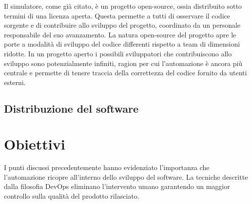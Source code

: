 Il simulatore, come già citato, è un progetto open-source, ossia distribuito sotto termini di una licenza aperta. Questa permette a tutti di osservare il codice sorgente e di contribuire allo sviluppo del progetto, coordinato da un personale responsabile del suo avanzamento. La natura open-source del progetto apre le porte a modalità di sviluppo del codice differenti rispetto a team di dimensioni ridotte. In un progetto aperto i possibili sviluppatori che contribuiscono allo sviluppo sono potenzialmente infiniti, ragion per cui l'automazione è ancora più centrale e permette di tenere traccia della correttezza del codice fornito da utenti esterni. 


\subsection{Distribuzione del software}

\section{Obiettivi}
I punti discussi precedentemente hanno evidenziato l'importanza che l'automazione ricopre all'interno dello sviluppo del software. La tecniche descritte dalla filosofia DevOps eliminano l'intervento umano garantendo un maggior controllo sulla qualità del prodotto rilasciato. 


